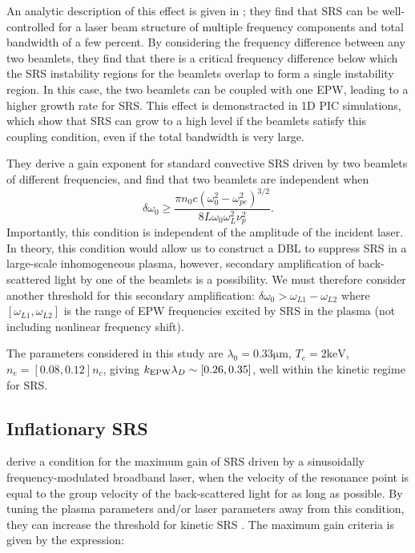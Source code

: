 An analytic description of this effect is given in \citet{Zhao2019}; they find that SRS can be well-controlled for a laser beam structure of multiple frequency components and total bandwidth of a few
percent. By considering the frequency difference between any two beamlets, they find that
there is a critical frequency difference below which the SRS instability regions
for the beamlets overlap to form a single instability region. In this case, the
two beamlets can be coupled with one EPW, leading to a higher growth rate for
SRS. This effect is demonstracted in 1D PIC simulations, which show that SRS can grow to a high level if the beamlets satisfy this coupling condition, even if the total bandwidth is very large.

They derive a gain exponent for standard convective SRS driven by two
beamlets of different frequencies, and find that two beamlets are independent
when
\begin{equation}\label{DLB_threshold_inhomo}
\delta \omega_{0} \geq \frac{\pi n_{0} c\left(\omega_{0}^{2}-\omega_{p
e}^{2}\right)^{3 / 2}}{8 L \omega_{0} \omega_{L}^{2} \nu_{p}^{2}}.
\end{equation}
Importantly, this condition is independent of the amplitude of the incident
laser. In theory, this condition would allow us to construct a DBL to suppress
SRS in a large-scale inhomogeneous plasma, however, secondary amplification of
back-scattered light by one of the beamlets is a possibility. We must therefore
consider another threshold for this secondary amplification: $\delta\omega_0 >
\omega_{L1}-\omega_{L2}$ where $[\omega_{L1},\omega_{L2}]$ is the range of EPW
frequencies excited by SRS in the plasma (not including nonlinear frequency
shift).



The parameters considered in this study are
$\lambda_0=0.33\si{\micro\metre}$,
$T_e=2\si{\kilo\electronvolt}$, $n_e = [0.08,0.12]n_c$, giving $k_\mathrm{EPW}\lambda_D \sim
[0.26,0.35]$, well within the kinetic regime for SRS.

\subsection{Inflationary SRS}

\citet{Wen2021} derive a condition for the maximum gain of SRS driven by a sinusoidally frequency-modulated broadband laser, when the velocity of the resonance point is equal to the group velocity of the back-scattered light for as long as possible. By tuning the plasma parameters and/or laser parameters away from this condition, they can increase the threshold for kinetic SRS \citep{Wen2021}. The maximum gain criteria is given by the expression:

